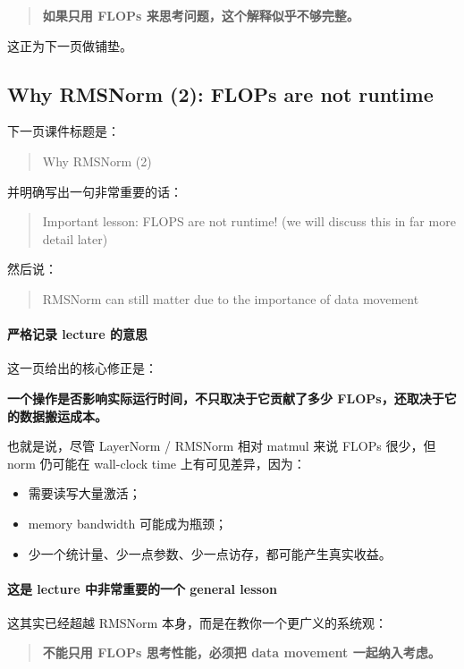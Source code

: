 \documentclass[a4paper,UTF8]{article}
\numberwithin{equation}{section}
\begin{document}
\begin{quote}
\textbf{如果只用 FLOPs 来思考问题，这个解释似乎不够完整。}
\end{quote}

这正为下一页做铺垫。

\subsection{Why RMSNorm (2): FLOPs are not runtime}

下一页课件标题是：
\begin{quote}
Why RMSNorm (2)
\end{quote}

并明确写出一句非常重要的话：
\begin{quote}
Important lesson: FLOPS are not runtime! (we will discuss this in far more detail later)
\end{quote}

然后说：
\begin{quote}
RMSNorm can still matter due to the importance of data movement
\end{quote}

\paragraph{严格记录 lecture 的意思}
这一页给出的核心修正是：

\begin{center}
\textbf{一个操作是否影响实际运行时间，不只取决于它贡献了多少 FLOPs，还取决于它的数据搬运成本。}
\end{center}

也就是说，尽管 LayerNorm / RMSNorm 相对 matmul 来说 FLOPs 很少，但 norm 仍可能在 wall-clock time 上有可见差异，因为：
\begin{itemize}
    \item 需要读写大量激活；
    \item memory bandwidth 可能成为瓶颈；
    \item 少一个统计量、少一点参数、少一点访存，都可能产生真实收益。
\end{itemize}

\paragraph{这是 lecture 中非常重要的一个 general lesson}
这其实已经超越 RMSNorm 本身，而是在教你一个更广义的系统观：

\begin{quote}
\textbf{不能只用 FLOPs 思考性能，必须把 data movement 一起纳入考虑。}
\end{quote}
\end{document}
